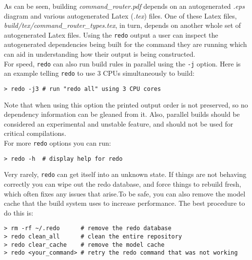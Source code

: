 As can be seen, building \textit{command\_router.pdf} depends on an autogenerated \textit{.eps} diagram and various autogenerated Latex (\textit{.tex}) files. One of these Latex files, \textit{build/tex/command\_router\_types.tex}, in turn, depends on another whole set of autogenerated Latex files. Using the \texttt{redo} output a user can inspect the autogenerated dependencies being built for the command they are running which can aid in understanding how their output is being constructed. \\

For speed, \texttt{redo} can also run build rules in parallel using the \texttt{-j} option. Here is an example telling \texttt{redo} to use 3 CPUs simultaneously to build:

\vspace{5mm} %
\begin{verbatim}
> redo -j3 # run "redo all" using 3 CPU cores
\end{verbatim}
\vspace{5mm} %

Note that when using this option the printed output order is not preserved, so no dependency information can be gleaned from it. Also, parallel builds should be considered an experimental and unstable feature, and should not be used for critical compilations. \\

For more \texttt{redo} options you can run:

\vspace{5mm} %
\begin{verbatim}
> redo -h  # display help for redo
\end{verbatim}
\vspace{5mm} %

Very rarely, \texttt{redo} can get itself into an unknown state. If things are not behaving correctly you can wipe out the redo database, and force things to rebuild fresh, which often fixes any issues that arise.To be safe, you can also remove the model cache that the build system uses to increase performance. The best procedure to do this is:

\vspace{5mm} %
\begin{verbatim}
> rm -rf ~/.redo      # remove the redo database
> redo clean_all      # clean the entire repository
> redo clear_cache    # remove the model cache
> redo <your_command> # retry the redo command that was not working
\end{verbatim}
\vspace{5mm} %

